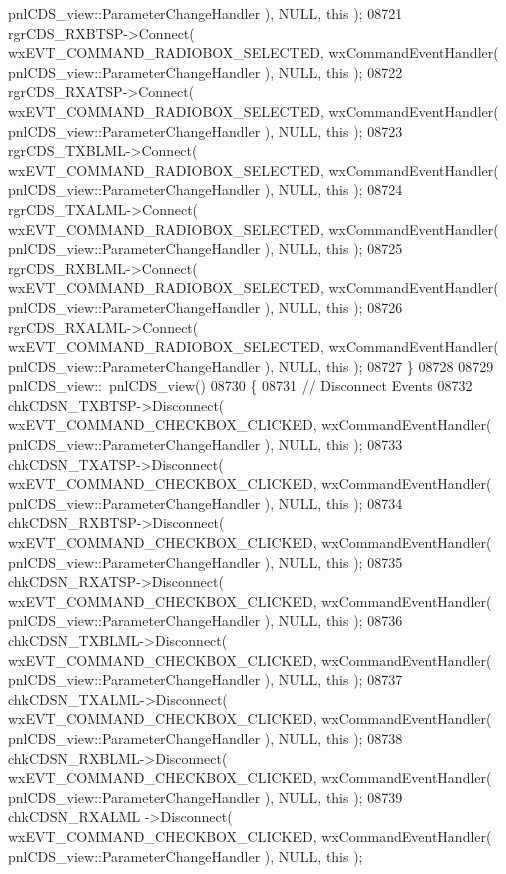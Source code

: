 \begin{DoxyCode}
      pnlCDS_view::ParameterChangeHandler ), NULL, \textcolor{keyword}{this} );
08721     rgrCDS_RXBTSP->Connect( wxEVT\_COMMAND\_RADIOBOX\_SELECTED, wxCommandEventHandler( 
      pnlCDS_view::ParameterChangeHandler ), NULL, \textcolor{keyword}{this} );
08722     rgrCDS_RXATSP->Connect( wxEVT\_COMMAND\_RADIOBOX\_SELECTED, wxCommandEventHandler( 
      pnlCDS_view::ParameterChangeHandler ), NULL, \textcolor{keyword}{this} );
08723     rgrCDS_TXBLML->Connect( wxEVT\_COMMAND\_RADIOBOX\_SELECTED, wxCommandEventHandler( 
      pnlCDS_view::ParameterChangeHandler ), NULL, \textcolor{keyword}{this} );
08724     rgrCDS_TXALML->Connect( wxEVT\_COMMAND\_RADIOBOX\_SELECTED, wxCommandEventHandler( 
      pnlCDS_view::ParameterChangeHandler ), NULL, \textcolor{keyword}{this} );
08725     rgrCDS_RXBLML->Connect( wxEVT\_COMMAND\_RADIOBOX\_SELECTED, wxCommandEventHandler( 
      pnlCDS_view::ParameterChangeHandler ), NULL, \textcolor{keyword}{this} );
08726     rgrCDS_RXALML->Connect( wxEVT\_COMMAND\_RADIOBOX\_SELECTED, wxCommandEventHandler( 
      pnlCDS_view::ParameterChangeHandler ), NULL, \textcolor{keyword}{this} );
08727 \}
08728 
08729 pnlCDS_view::~pnlCDS_view()
08730 \{
08731     \textcolor{comment}{// Disconnect Events}
08732     chkCDSN_TXBTSP->Disconnect( wxEVT\_COMMAND\_CHECKBOX\_CLICKED, wxCommandEventHandler( 
      pnlCDS_view::ParameterChangeHandler ), NULL, \textcolor{keyword}{this} );
08733     chkCDSN_TXATSP->Disconnect( wxEVT\_COMMAND\_CHECKBOX\_CLICKED, wxCommandEventHandler( 
      pnlCDS_view::ParameterChangeHandler ), NULL, \textcolor{keyword}{this} );
08734     chkCDSN_RXBTSP->Disconnect( wxEVT\_COMMAND\_CHECKBOX\_CLICKED, wxCommandEventHandler( 
      pnlCDS_view::ParameterChangeHandler ), NULL, \textcolor{keyword}{this} );
08735     chkCDSN_RXATSP->Disconnect( wxEVT\_COMMAND\_CHECKBOX\_CLICKED, wxCommandEventHandler( 
      pnlCDS_view::ParameterChangeHandler ), NULL, \textcolor{keyword}{this} );
08736     chkCDSN_TXBLML->Disconnect( wxEVT\_COMMAND\_CHECKBOX\_CLICKED, wxCommandEventHandler( 
      pnlCDS_view::ParameterChangeHandler ), NULL, \textcolor{keyword}{this} );
08737     chkCDSN_TXALML->Disconnect( wxEVT\_COMMAND\_CHECKBOX\_CLICKED, wxCommandEventHandler( 
      pnlCDS_view::ParameterChangeHandler ), NULL, \textcolor{keyword}{this} );
08738     chkCDSN_RXBLML->Disconnect( wxEVT\_COMMAND\_CHECKBOX\_CLICKED, wxCommandEventHandler( 
      pnlCDS_view::ParameterChangeHandler ), NULL, \textcolor{keyword}{this} );
08739     chkCDSN_RXALML ->Disconnect( wxEVT\_COMMAND\_CHECKBOX\_CLICKED, wxCommandEventHandler( 
      pnlCDS_view::ParameterChangeHandler ), NULL, \textcolor{keyword}{this} );

\end{DoxyCode}
